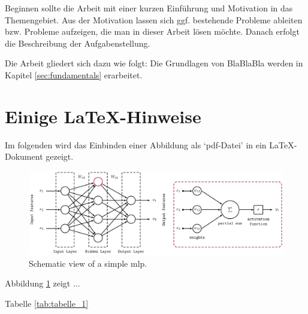 Beginnen sollte die Arbeit mit einer kurzen Einführung und Motivation in das Themengebiet. Aus der Motivation lassen sich ggf. bestehende Probleme ableiten bzw. Probleme aufzeigen, die man in dieser Arbeit lösen möchte. Danach erfolgt die Beschreibung der Aufgabenstellung.

Die Arbeit gliedert sich dazu wie folgt: Die Grundlagen von BlaBlaBla 
werden in Kapitel \ref{sec:fundamentals} erarbeitet. 

\section{Einige LaTeX-Hinweise}

Im folgenden wird das Einbinden einer Abbildung als `pdf-Datei' in ein
\LaTeX-Dokument gezeigt.

\begin{figure}[H]
	\centering
	\includegraphics[width=\linewidth]{figures/example_fig.pdf}
	\caption[Schematic view of a simple MLP.]{Schematic view of a simple \gls{mlp}.}
  \label{fig:mlp}
\end{figure}

Abbildung \ref{fig:mlp} zeigt ...

Tabelle \ref{tab:tabelle_1}

